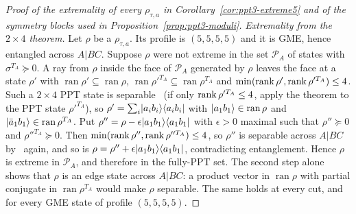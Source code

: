 \begin{proof}[Proof of the extremality of every $\rho_{\tau,a}$ in Corollary~\ref{cor:ppt3-extreme5} and of the symmetry blocks used in Proposition~\ref{prop:ppt3-moduli}]
\emph{Extremality from the $2\times4$ theorem.} Let $\rho$ be a $\rho_{\tau,a}$. Its profile is $(5,5,5,5)$ and it is GME, hence entangled across $A|BC$.
Suppose $\rho$ were not extreme in the set $\mathcal P_A$ of states with $\sigma^{T_A}\succeq0$. A ray from $\rho$ inside the face of $\mathcal P_A$ generated by
$\rho$ leaves the face at a state $\rho'$ with $\operatorname{ran}\rho'\subseteq\operatorname{ran}\rho$, $\operatorname{ran}\rho'^{T_A}\subseteq\operatorname{ran}\rho^{T_A}$
and $\min(\operatorname{rank}\rho',\operatorname{rank}\rho'^{T_A})\le4$. Such a $2\times4$ PPT state is separable~\cite{KCKL,HLVC} (if only $\operatorname{rank}\rho'^{T_A}\le4$, apply
the theorem to the PPT state $\rho'^{T_A}$), so $\rho'=\sum_i\lvert a_ib_i\rangle\langle a_ib_i\rvert$ with
$\lvert a_1b_1\rangle\in\operatorname{ran}\rho$ and $\lvert\bar a_1b_1\rangle\in\operatorname{ran}\rho^{T_A}$. Put $\rho''=\rho-\epsilon\lvert a_1b_1\rangle\langle a_1b_1\rvert$
with $\epsilon>0$ maximal such that $\rho''\succeq0$ and $\rho''^{T_A}\succeq0$. Then $\min(\operatorname{rank}\rho'',\operatorname{rank}\rho''^{T_A})\le4$, so $\rho''$
is separable across $A|BC$ by~\cite{KCKL,HLVC} again, and so is $\rho=\rho''+\epsilon\lvert a_1b_1\rangle\langle a_1b_1\rvert$, contradicting entanglement. Hence $\rho$ is extreme in
$\mathcal P_A$, and therefore in the fully-PPT set. The second step alone shows that $\rho$ is an edge state across $A|BC$: a product vector in
$\operatorname{ran}\rho$ with partial conjugate in $\operatorname{ran}\rho^{T_A}$ would make $\rho$ separable. The same holds at every cut, and for every GME state of profile $(5,5,5,5)$.


\end{proof}
